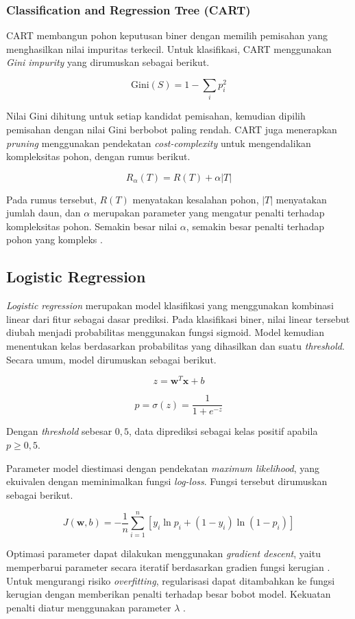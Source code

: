 \subsubsection{Classification and Regression Tree (CART)}
CART membangun pohon keputusan biner dengan memilih pemisahan yang menghasilkan nilai impuritas terkecil. Untuk klasifikasi, CART menggunakan \textit{Gini impurity} yang dirumuskan sebagai berikut.

\[
\mathrm{Gini}(S)=1-\sum_i p_i^2
\]

Nilai Gini dihitung untuk setiap kandidat pemisahan, kemudian dipilih pemisahan dengan nilai Gini berbobot paling rendah. CART juga menerapkan \textit{pruning} menggunakan pendekatan \textit{cost-complexity} untuk mengendalikan kompleksitas pohon, dengan rumus berikut.

\[
R_{\alpha}(T)=R(T)+\alpha|T|
\]

Pada rumus tersebut, $R(T)$ menyatakan kesalahan pohon, $|T|$ menyatakan jumlah daun, dan $\alpha$ merupakan parameter yang mengatur penalti terhadap kompleksitas pohon. Semakin besar nilai $\alpha$, semakin besar penalti terhadap pohon yang kompleks \cite{ref:breiman-1984}.

\subsection{Logistic Regression}
\textit{Logistic regression} merupakan model klasifikasi yang menggunakan kombinasi linear dari fitur sebagai dasar prediksi. Pada klasifikasi biner, nilai linear tersebut diubah menjadi probabilitas menggunakan fungsi sigmoid. Model kemudian menentukan kelas berdasarkan probabilitas yang dihasilkan dan suatu \textit{threshold}. Secara umum, model dirumuskan sebagai berikut.

\[
z=\mathbf{w}^{T}\mathbf{x}+b
\]

\[
p=\sigma(z)=\frac{1}{1+e^{-z}}
\]

Dengan \textit{threshold} sebesar $0{,}5$, data diprediksi sebagai kelas positif apabila $p\geq 0{,}5$.

Parameter model diestimasi dengan pendekatan \textit{maximum likelihood}, yang ekuivalen dengan meminimalkan fungsi \textit{log-loss}. Fungsi tersebut dirumuskan sebagai berikut.

\[
J(\mathbf{w},b)=
-\frac{1}{n}\sum_{i=1}^{n}
\left[
y_i\ln p_i+(1-y_i)\ln(1-p_i)
\right]
\]

Optimasi parameter dapat dilakukan menggunakan \textit{gradient descent}, yaitu memperbarui parameter secara iteratif berdasarkan gradien fungsi kerugian \cite{ref:materi-11}. Untuk mengurangi risiko \textit{overfitting}, regularisasi dapat ditambahkan ke fungsi kerugian dengan memberikan penalti terhadap besar bobot model. Kekuatan penalti diatur menggunakan parameter $\lambda$ \cite{ref:hastie-2009}.

